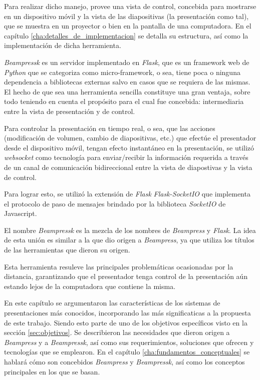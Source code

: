 		Para realizar dicho manejo, provee una vista de control, concebida para mostrarse en un dispositivo móvil y la vista de las diapositivas (la presentación como tal), que se muestra en un proyector o bien en la pantalla de una computadora. En el capítulo \ref{cha:detalles_de_implementacion} se detalla su estructura, así como la implementación de dicha herramienta.

		\textit{Beampressk} es un servidor implementado en \textit{Flask}, que es un framework web de \textit{Python} que se categoriza como micro-framework, o sea, tiene poca o ninguna dependencia a bibliotecas externas salvo en casos que se requiera de las mismas. El hecho de que sea una herramienta sencilla constituye una gran ventaja, sobre todo teniendo en cuenta el propósito para el cual fue concebida: intermediaria entre la vista de presentación y de control.

		Para controlar la presentación en tiempo real, o sea, que las acciones (modificación de volumen, cambio de diapositivas, etc.) que efectúe el presentador desde el dispositivo móvil, tengan efecto instantáneo en la presentación, se utilizó \textit{websocket} como tecnología para enviar/recibir la información requerida a través de un canal de comunicación bidireccional entre la vista de diapostivas y la vista de control.

		Para lograr esto, se utilizó la extensión de \textit{Flask} \textit{Flask-SocketIO} que implementa el protocolo de paso de mensajes brindado por la biblioteca \textit{SocketIO} de Javascript.

		El nombre \textit{Beampressk} es la mezcla de los nombres de \textit{Beampress} y \textit{Flask}. La idea de esta unión es similar a la que dio origen a \textit{Beampress}, ya que utiliza los títulos de las herramientas que dieron su origen.

		Esta herramienta resuleve las principales problemáticas ocasionadas por la distancia, garantizando que el presentador tenga control de la presentación aún estando lejos de la computadora que contiene la misma.

		En este capítulo se argumentaron las características de los sistemas de presentaciones más conocidos, incorporando las más significaticas a la propuesta de este trabajo. Siendo esto parte de uno de los objetivos específicos visto en la sección \ref{sec:objetivos}. Se describieron las necesidades que dieron origen a \textit{Beampress} y a \textit{Beampressk}, así como sus requerimientos, soluciones que ofrecen y tecnologías que se emplearon. En el capítulo \ref{cha:fundamentos_conceptuales} se hablará cómo son concebidos \textit{Beampress} y \textit{Beampressk}, así como los conceptos principales en los que se basan.






